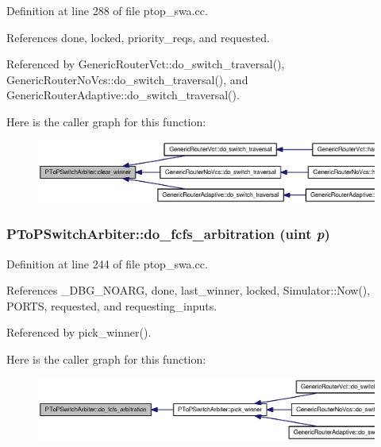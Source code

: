 Definition at line 288 of file ptop\_\-swa.cc.

References done, locked, priority\_\-reqs, and requested.

Referenced by GenericRouterVct::do\_\-switch\_\-traversal(), GenericRouterNoVcs::do\_\-switch\_\-traversal(), and GenericRouterAdaptive::do\_\-switch\_\-traversal().

Here is the caller graph for this function:\nopagebreak
\begin{figure}[H]
\begin{center}
\leavevmode
\includegraphics[width=420pt]{classPToPSwitchArbiter_752c022c63e6552d06798d65e634f8d4_icgraph}
\end{center}
\end{figure}
\subsubsection[{do\_\-fcfs\_\-arbitration}]{ PToPSwitchArbiter::do\_\-fcfs\_\-arbitration ({\bf uint} {\em p})}\label{classPToPSwitchArbiter_3e59f4eb3486f1b5355476c50550f702}




Definition at line 244 of file ptop\_\-swa.cc.

References \_\-DBG\_\-NOARG, done, last\_\-winner, locked, Simulator::Now(), PORTS, requested, and requesting\_\-inputs.

Referenced by pick\_\-winner().

Here is the caller graph for this function:\nopagebreak
\begin{figure}[H]
\begin{center}
\leavevmode
\includegraphics[width=420pt]{classPToPSwitchArbiter_3e59f4eb3486f1b5355476c50550f702_icgraph}
\end{center}
\end{figure}
